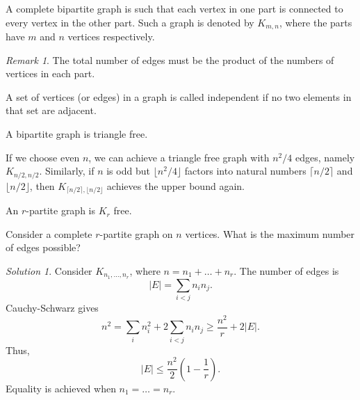 \documentclass[11pt]{article}
\theoremstyle{definition}
\theoremstyle{remark}
\newtheorem*{remark}{Remark}
\newtheorem*{solution}{Solution}
\numberwithin{equation}{section}
\begin{document}
    \begin{definition}
        A complete bipartite graph is such that each vertex in one part is connected
        to every vertex in the other part. Such a graph is denoted by $K_{m,n}$,
        where the parts have $m$ and $n$ vertices respectively.

        \begin{remark}
            The total number of edges must be the product of the numbers of vertices
            in each part.
        \end{remark}
    \end{definition}

    \begin{definition}
        A set of vertices (or edges) in a graph is called independent if no two
        elements in that set are adjacent.
    \end{definition}

    \begin{lemma}
        A bipartite graph is triangle free.
    \end{lemma}

    \begin{corollary}
        If we choose even $n$, we can achieve a triangle free graph with $n^2 / 4$
        edges, namely $K_{n / 2, n / 2}$. Similarly, if $n$ is odd but $\lfloor n^2 /
        4\rfloor$ factors into natural numbers $\lceil n / 2\rceil$ and $\lfloor n /
        2 \rfloor$, then $K_{\lceil n / 2\rceil, \lfloor n / 2 \rfloor}$ achieves the
        upper bound again.
    \end{corollary}
    
    \begin{lemma}
        An $r$-partite graph is $K_r$ free.
    \end{lemma}

    \begin{exercise}
        Consider a complete $r$-partite graph on $n$ vertices. What is the maximum
        number of edges possible?
        \begin{solution}
            Consider $K_{n_1, \dots, n_r}$, where $n = n_1 + \dots + n_r$. The number
            of edges is \[
                |E| = \sum_{i < j} n_i n_j.
            \] Cauchy-Schwarz gives \[
                n^2 = \sum_{i} n_i^2 + 2\sum_{i < j} n_i n_j \geq \frac{n^2}{r} +
                2|E|.
            \] Thus, \[
                |E| \leq \frac{n^2}{2}\left(1 - \frac{1}{r}\right).
            \] Equality is achieved when $n_1 = \dots = n_r$.
        \end{solution}
    \end{exercise}
\end{document}
